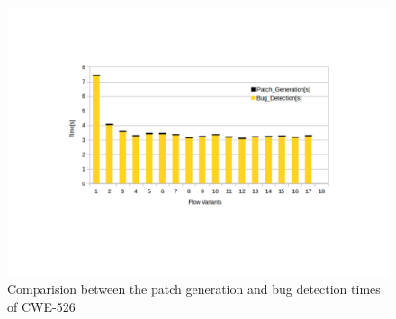 \begin{figure}[!htb]
\centering
\includegraphics[trim=5.0cm 0.0cm 0.0cm 0.0cm, scale=0.7]{pdf/time1.pdf}
\vspace{-4.5cm}
\caption{Comparision between the patch generation and bug detection times of CWE-526}
\label{fig:time1}
\end{figure}


